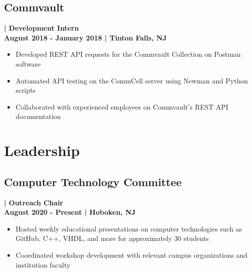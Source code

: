\documentclass[a4paper, 11pt]{article}
\newenvironment{tightemize}{
\vspace{-\topsep}\begin{itemize}[leftmargin=1em]\itemsep1pt \parskip0pt \parsep0pt}
{\end{itemize}\vspace{-\topsep}}
\begin{document}
\begin{minipage}[h]{0.63\textwidth}
\subsection{Commvault}\textbf{\textcolor{location}{| Development Intern}}\\
\hspace{-6pt}\vspace{0.8em}\textbf{\textcolor{location}{August 2018 - January 2018 | Tinton Falls, NJ}}
\vspace{-0.5em}
\begin{tightemize}
\item{\textcolor{location}{Developed REST API requests for the Commvault Collection on Postman software}}
\item{\textcolor{location}{Automated API testing on the CommCell server using Newman and Python scripts}}
\item{\textcolor{location}{Collaborated with experienced employees on Commvault’s REST API documentation}}

\end{tightemize}
\vspace{-1em}
\section{Leadership}
\subsection{Computer Technology Committee}\textbf{\textcolor{location}{| Outreach Chair}}\\ 
\hspace{-6pt}\vspace{0.8em}\textbf{\textcolor{location}{August 2020 - Present | Hoboken, NJ}}
\vspace{-0.5em}
\begin{tightemize}
\item{\textcolor{location}{Hosted weekly educational presentations on computer technologies such as GitHub, C++, VHDL, and more for approximately 30 students}}
\item{\textcolor{location}{Coordinated workshop development with relevant campus organizations and institution faculty}}
\end{tightemize}
\vspace{-1em}

\end{minipage}
\end{document}
